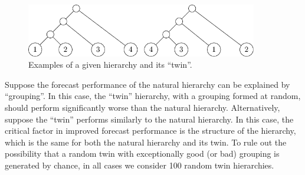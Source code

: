 \documentclass[a4paper,review,12pt,authoryear]{elsarticle}
\begin{document}

\begin{figure}[h!]
    \centering
    \includegraphics[width=0.9\textwidth]{figures/aggcluster_random.pdf}
\caption{\label{fig:aggcluster_random}Examples of a given hierarchy and its ``twin''. }
\end{figure}

Suppose the forecast performance of the natural hierarchy can be explained by ``grouping''. In this case, the ``twin'' hierarchy, with a grouping formed at random, should perform significantly worse than the natural hierarchy. Alternatively, suppose the ``twin'' performs similarly to the natural hierarchy. In this case, the critical factor in improved forecast performance is the structure of the hierarchy, which is the same for both the natural hierarchy and its twin. To rule out the possibility that a random twin with exceptionally good (or bad) grouping is generated by chance, in all cases we consider 100 random twin hierarchies.


\end{document}
